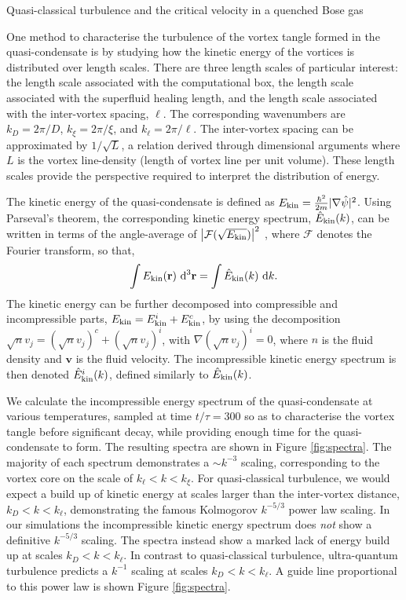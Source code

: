 \begin{chapter}{\label{cha:nonequib}Quasi-classical turbulence and the critical velocity in a quenched Bose gas}
\begin{figure}
\end{figure}
One method to characterise the turbulence of the vortex tangle formed in the quasi-condensate is by studying how the kinetic energy of the vortices is distributed over length scales. There are three length scales of particular interest: the length scale associated with the computational box, the length scale associated with the superfluid healing length, and the length scale associated with the inter-vortex spacing, $\ell$. The corresponding wavenumbers are $k_D=2\pi/D$, $k_\xi = 2\pi/\xi$, and $k_\ell = 2\pi/\ell$. The inter-vortex spacing can be approximated by $1/\sqrt{L}$, a relation derived through dimensional arguments where $L$ is the vortex line-density (length of vortex line per unit volume). These length scales provide the perspective required to interpret the distribution of energy.

The kinetic energy of the quasi-condensate is defined as $E_{\rm kin} = \frac{\hbar^2}{2m}|\nabla \hat\psi|^2$.
 Using Parseval's theorem, the corresponding kinetic energy spectrum, $\hat{E}_{\rm kin}(k)$, can be written in terms of the angle-average of $\left |\mathcal{F}(\sqrt{E_{\rm kin}})\right |^2$ \cite{Nore},
where $\mathcal{F}$ denotes the Fourier transform, so that,
\begin{equation}
  \int E_{\rm kin}({\bf r})~{\rm d}^3{\bf r} = \int \hat{E}_{\rm kin}(k)~{\mathrm d}k.
  \label{eq:Ekin}
\end{equation}
The kinetic energy can be further decomposed into compressible and incompressible parts, $E_{\rm kin} = E^i_{\rm kin} + E^c_{\rm kin}$, by using the decomposition \cite{Nore} $\sqrt{n}v_j = (\sqrt{n}v_j)^c + (\sqrt{n}v_j)^i$, with $\nabla(\sqrt{n}v_j)^i=0$, where $n$ is the fluid density and $\mathbf{v}$ is the fluid velocity. The incompressible kinetic energy spectrum is then denoted $\hat{E}^i_{\rm kin}(k)$, defined similarly to $\hat{E}_{\rm kin}(k)$.

We calculate the incompressible energy spectrum of the quasi-condensate at various temperatures, sampled at time $t/\tau=300$ so as to characterise the vortex tangle before significant decay, while providing enough time for the quasi-condensate to form. The resulting spectra are shown in Figure \ref{fig:spectra}. The majority of each spectrum demonstrates a $\sim k^{-3}$ scaling, corresponding to the vortex core on the scale of $k_\ell<k<k_\xi$. For quasi-classical turbulence, we would expect a build up of kinetic energy at scales larger than the inter-vortex distance, $k_D<k<k_\ell$, demonstrating the famous Kolmogorov $k^{-5/3}$ power law scaling. In our simulations the incompressible kinetic energy spectrum does {\it not} show a definitive $k^{-5/3}$ scaling. The spectra instead show a marked lack of energy build up at scales $k_D<k<k_\ell$. In contrast to quasi-classical turbulence, ultra-quantum turbulence predicts a $k^{-1}$ scaling at scales $k_D<k<k_\ell$. A guide line proportional to this power law is shown Figure \ref{fig:spectra}.


\end{chapter}
